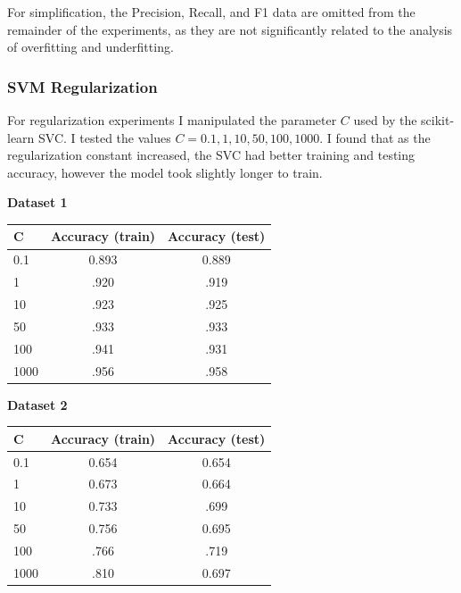 \documentclass{article}
\begin{document}
For simplification, the Precision, Recall, and F1 data are omitted from the remainder of the experiments, as they are not significantly related to the analysis of overfitting and underfitting.

\subsubsection{SVM Regularization}

For regularization experiments I manipulated the parameter $C$ used by the scikit-learn SVC. I tested the values $C=0.1, 1, 10, 50, 100, 1000$. I found that as the regularization constant increased, the SVC had better training and testing accuracy, however the model took slightly longer to train.

\begin{center}\textbf{Dataset 1}\end{center}
\begin{center}
\begin{tabular}{| l | c | c |}
    \hline
    \textbf{C} & \textbf{Accuracy (train)} & \textbf{Accuracy (test)} \\
    \hline
        0.1 & 0.893 & 0.889 \\
        1 & .920 & .919 \\
        10 & .923 & .925 \\
        50 & .933 & .933 \\
        100 & .941 & .931 \\
        1000 & .956 & .958 \\
    \hline
\end{tabular}
\end{center}

\begin{center}\textbf{Dataset 2}\end{center}
\begin{center}
\begin{tabular}{| l | c | c |}
    \hline
    \textbf{C} & \textbf{Accuracy (train)} & \textbf{Accuracy (test)} \\
    \hline
        0.1 & 0.654 & 0.654 \\
        1 & 0.673 & 0.664 \\
        10 & 0.733 & .699 \\
        50 & 0.756 & 0.695 \\
        100 & .766 & .719 \\
        1000 & .810 & 0.697 \\
    \hline
\end{tabular}\end{center}
\end{document}
